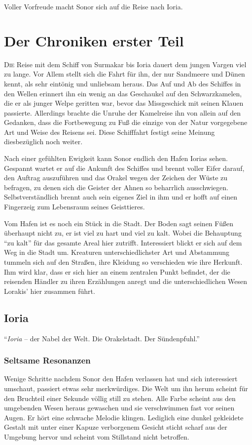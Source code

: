 \documentclass[a4paper]{scrreprt}
\def\capitalsfont{\usefont{U}{AnnSton}{xl}{n}\selectfont}
\newcommand{\capital}[2]{\lettrine[lines=8]{\capitalsfont #1}{#2}}
\begin{document}
Voller Vorfreude macht Sonor sich auf die Reise nach Ioria.


\part{Der Chroniken erster Teil}
\capital{D}{ie} Reise mit dem Schiff von Surmakar bis Ioria dauert dem jungen Vargen viel zu lange. 
Vor Allem stellt sich die Fahrt für ihn, der nur Sandmeere und Dünen kennt, als sehr eintönig und unliebsam heraus.
Das Auf und Ab des Schiffes in den Wellen erinnert ihn ein wenig an das Geschaukel auf den Schwarzkamelen, die er als junger Welpe geritten war, bevor das Missgeschick mit seinen Klauen passierte.
Allerdings brachte die Unruhe der Kamelreise ihn von allein auf den Gedanken, dass die Fortbewegung zu Fuß die einzige von der Natur vorgegebene Art und Weise des Reisens sei.
Diese Schifffahrt festigt seine Meinung diesbezüglich noch weiter.
 
Nach einer gefühlten Ewigkeit kann Sonor endlich den Hafen Iorias sehen.
Gespannt wartet er auf die Ankunft des Schiffes und brennt voller Eifer darauf, den Auftrag auszuführen und das Orakel wegen der Zeichen der Wüste zu befragen, zu denen sich die Geister der Ahnen so beharrlich ausschwiegen. Selbstverständlich brennt auch sein eigenes Ziel in ihm und er hofft auf einen Fingerzeig zum Lebensraum seines Geisttieres.

Vom Hafen ist es noch ein Stück in die Stadt. Der Boden sagt seinen Füßen überhaupt nicht zu, er ist viel zu hart und viel zu kalt. 
Wobei die Behauptung \enquote{zu kalt} für das gesamte Areal hier zutrifft.
Interessiert blickt er sich auf dem Weg in die Stadt um. Kreaturen unterschiedlichster Art und Abstammung tummeln sich auf den Straßen, ihre Kleidung so verschieden wie ihre Herkunft. Ihm wird klar, dass er sich hier an einem zentralen Punkt befindet, der die reisenden Händler zu ihren Erzählungen anregt und die unterschiedlichen Wesen Lorakis' hier zusammen führt. 

\chapter[13. November 2016]{Ioria}
\begin{center}
\enquote{\emph{Ioria} -- der Nabel der Welt. Die Orakelstadt. Der Sündenpfuhl.}
\end{center}

\section{Seltsame Resonanzen}
Wenige Schritte nachdem Sonor den Hafen verlassen hat und sich interessiert umschaut, passiert etwas sehr merkwürdiges. Die Welt um ihn herum scheint für den Bruchteil einer Sekunde völlig still zu stehen. Alle Farbe scheint aus den umgebenden Wesen heraus gewaschen und sie verschwimmen fast vor seinen Augen. Er hört eine schwache Melodie klingen.
Lediglich eine dunkel gekleidete Gestalt mit unter einer Kapuze verborgenem Gesicht sticht scharf aus der Umgebung hervor und scheint vom Stillstand nicht betroffen.
\end{document}

